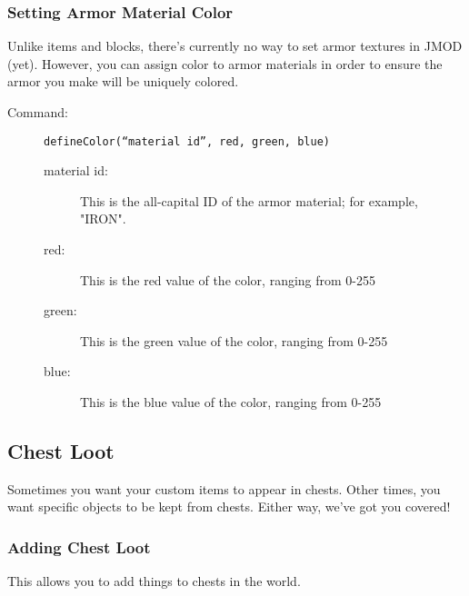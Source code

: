 \documentclass[letterpaper,titlepage,12pt]{article}
\begin{document}
\subsubsection{Setting Armor Material Color}

Unlike items and blocks, there's currently no way to set armor textures in JMOD (yet).  However, you can assign color to armor materials in order to ensure the armor you make will be uniquely colored.

\begin{description}
\item[Command:] \texttt{defineColor(``material id'', red, green, blue)}
\begin{description}
\item [material id:] This is the all-capital ID of the armor material; for example, "IRON".
\item [red:] This is the red value of the color, ranging from 0-255
\item [green:] This is the green value of the color, ranging from 0-255
\item [blue:] This is the blue value of the color, ranging from 0-255
\end{description}
\end{description}

\subsection{Chest Loot}

Sometimes you want your custom items to appear in chests.  Other times, you want specific objects to be kept from chests.  Either way, we've got you covered!

\subsubsection{Adding Chest Loot}

This allows you to add things to chests in the world.
\end{document}
